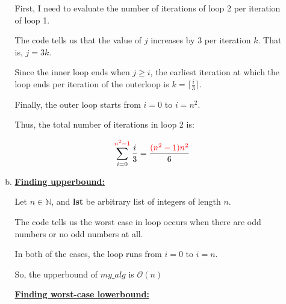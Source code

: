 \documentclass[12pt]{article}
\begin{document}
\begin{enumerate}[1.]
\begin{enumerate}[a)]
\begin{mdframed}
            First, I need to evaluate the number of iterations of loop 2 per iteration of loop 1.

            \bigskip

            The code tells us that the value of $j$ increases by 3 per iteration $k$. That is, $j = 3k$.

            \bigskip

            Since the inner loop ends when $j \geq i$, the earliest iteration at which
            the loop ends per iteration of the outerloop is $k = \lceil \frac{i}{3} \rceil$.

            \bigskip

            Finally, the outer loop starts from $i = 0$ to $i = n^2$.

            \bigskip

            Thus, the total number of iterations in loop 2 is:

            \setcounter{equation}{0}
            \begin{align}
                \sum\limits_{i=0}^{\color{red}n^2-1\color{black}} \frac{i}{3} = \frac{\color{red}(n^2-1)n^2\color{black}}{6}
            \end{align}

            \bigskip

        \end{mdframed}

        \item

        \underline{\textbf{Finding upperbound:}}

        \bigskip

        Let $n \in \mathbb{N}$, and \textbf{lst} be arbitrary list of integers of length $n$.

        \bigskip



        \bigskip

        The code tells us the worst case in loop occurs when there are odd numbers
        or no odd numbers at all.

        \bigskip

        In both of the cases, the loop runs from $i = 0$ to $i = n$.

        \bigskip

        So, the upperbound of $my\_alg$ is $\mathcal{O}(n)$

        \bigskip

        \underline{\textbf{Finding worst-case lowerbound:}}


\end{enumerate}
\end{enumerate}
\end{document}
